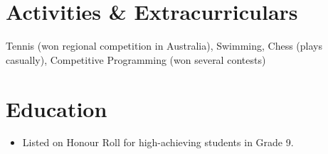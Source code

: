 \documentclass[10pt,a4paper,sans]{moderncv}
\begin{document}
\section{Activities \& Extracurriculars}
Tennis (won regional competition in Australia), Swimming, Chess (plays casually), Competitive Programming (won several contests)

\section{Education}
 {
\begin{itemize}
    \item Listed on Honour Roll for high-achieving students in Grade 9.
\end{itemize}
}
\end{document}
